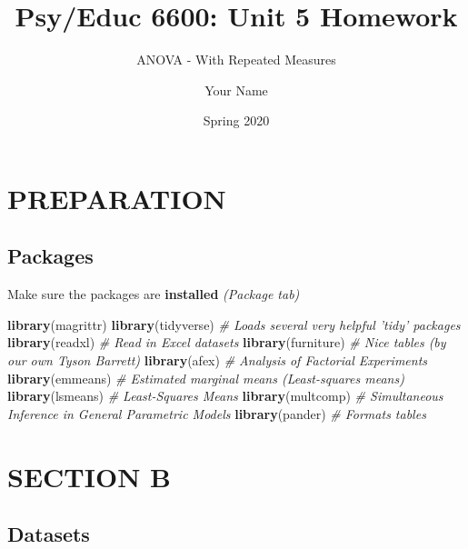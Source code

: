 \documentclass[
]{article}
\title{Psy/Educ 6600: Unit 5 Homework}
\subtitle{ANOVA - With Repeated Measures}
\author{Your Name}
\date{Spring 2020}
\newenvironment{Shaded}{\begin{snugshade}}{\end{snugshade}}
\newcommand{\CommentTok}[1]{\textcolor[rgb]{0.56,0.35,0.01}{\textit{#1}}}
\newcommand{\KeywordTok}[1]{\textcolor[rgb]{0.13,0.29,0.53}{\textbf{#1}}}
\newcommand{\NormalTok}[1]{#1}
\begin{document}
\maketitle

{
\setcounter{tocdepth}{3}
\tableofcontents
}
\clearpage

\hypertarget{preparation}{%
\section{PREPARATION}\label{preparation}}

\hypertarget{packages}{%
\subsection{Packages}\label{packages}}

Make sure the packages are \textbf{installed} \emph{(Package tab)}

\begin{Shaded}
\begin{Highlighting}[]
\KeywordTok{library}\NormalTok{(magrittr)}
\KeywordTok{library}\NormalTok{(tidyverse)    }\CommentTok{# Loads several very helpful 'tidy' packages}
\KeywordTok{library}\NormalTok{(readxl)       }\CommentTok{# Read in Excel datasets}
\KeywordTok{library}\NormalTok{(furniture)    }\CommentTok{# Nice tables (by our own Tyson Barrett)}
\KeywordTok{library}\NormalTok{(afex)         }\CommentTok{# Analysis of Factorial Experiments}
\KeywordTok{library}\NormalTok{(emmeans)      }\CommentTok{# Estimated marginal means (Least-squares means)}
\KeywordTok{library}\NormalTok{(lsmeans)      }\CommentTok{# Least-Squares Means}
\KeywordTok{library}\NormalTok{(multcomp)     }\CommentTok{# Simultaneous Inference in General Parametric Models }
\KeywordTok{library}\NormalTok{(pander)       }\CommentTok{# Formats tables }
\end{Highlighting}
\end{Shaded}

\clearpage

\hypertarget{section-b}{%
\section{SECTION B}\label{section-b}}

\hypertarget{datasets}{%
\subsection{Datasets}\label{datasets}}
\end{document}
